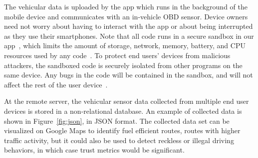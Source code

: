 The vehicular data is uploaded by the app
which runs in the background of the mobile device and communicates
with an in-vehicle OBD sensor. Device owners need not worry about having to
interact with the app or about being interrupted as they use their smartphones. 
Note that all code runs in a secure sandbox in our 
app~\cite{sensor-app}, which limits the amount of storage, network, 
memory, battery, and CPU resources used by any code~\cite{Cappos_CCS_10}. 
To protect end users' devices from malicious attackers, the sandboxed 
code is securely isolated from other programs on the same device.
Any bugs in the code will be contained in the sandbox, and will not 
affect the rest of the user device~\cite{Cappos_CCS_10}. 
%

At the remote server, the vehicular sensor data collected from 
multiple end user devices is stored in a non-relational database. 
An example of 
collected data is shown in Figure~\ref{fig:json}, in JSON format.
The collected data set can be visualized on Google Maps to 
identify fuel efficient routes, routes with higher traffic activity, 
but it could also be used to detect reckless or illegal driving behaviors,
in which case trust metrics would be significant.



